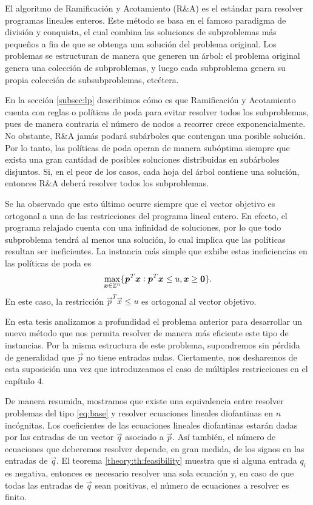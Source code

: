 \noindent
El algoritmo de Ramificación y Acotamiento (R\&A) es el estándar para resolver programas lineales
enteros. Este método se basa en el famoso paradigma de división y conquista, el cual combina las
soluciones de subproblemas más pequeños a fin de que se obtenga una solución del problema original.
Los problemas se estructuran de manera que generen un árbol: el problema original genera una
colección de subproblemas, y luego cada subproblema genera su propia colección de subsubproblemas,
etcétera.

En la sección \ref{subsec:lp} describimos cómo es que Ramificación y Acotamiento cuenta con reglas o
políticas de poda para evitar resolver todos los subproblemas, pues de manera contraria el número de
nodos a recorrer crece exponencialmente. No obstante, R\&A jamás podará subárboles que contengan una
posible solución. Por lo tanto, las políticas de poda operan de manera subóptima siempre que exista
una gran cantidad de posibles soluciones distribuidas en subárboles disjuntos. Si, en el peor de los
casos, cada hoja del árbol contiene una solución, entonces R\&A deberá resolver todos los
subproblemas.

Se ha observado que esto último ocurre siempre que el vector objetivo es ortogonal a una de las
restricciones del programa lineal entero. En efecto, el programa relajado cuenta con una infinidad
de soluciones, por lo que todo subproblema tendrá al menos una solución, lo cual implica que las
políticas resultan ser ineficientes. La instancia más simple que exhibe estas
ineficiencias en las políticas de poda es
\begin{equation}
	\label{eq:base}
	\max_{\boldsymbol{x} \in \mathbb{Z}^n} \lbrace \boldsymbol{p}^T\boldsymbol{x} \vcentcolon \boldsymbol{p}^T\boldsymbol{x} \leq u, \boldsymbol{x}
	\geq \boldsymbol{0} \rbrace.
\end{equation}
En este caso, la restricción $\vec{p}^T\vec{x} \leq u$ es ortogonal al vector objetivo.

En esta tesis analizamos a profundidad el problema anterior para desarrollar un nuevo método que nos
permita resolver de manera más eficiente este tipo de instancias. Por la misma estructura de este
problema, supondremos sin pérdida de generalidad que $\vec{p}$ no tiene entradas nulas. Ciertamente,
nos desharemos de esta suposición una vez que introduzcamos el caso de múltiples restricciones en el
capítulo 4.

De manera resumida, mostramos que existe una equivalencia entre resolver problemas del tipo
\eqref{eq:base} y resolver ecuaciones lineales diofantinas en $n$ incógnitas. Los coeficientes de
las ecuaciones lineales diofantinas estarán dadas por las entradas de un vector $\vec{q}$ asociado a
$\vec{p}$. Así también, el número de ecuaciones que deberemos resolver depende, en gran medida, de
los signos en las entradas de $\vec{q}$. El teorema \ref{theory:th:feasibility} muestra que si
alguna entrada $q_i$ es negativa, entonces es necesario resolver una sola ecuación y, en caso de que
todas las entradas de $\vec{q}$ sean positivas, el número de ecuaciones a resolver es finito.

